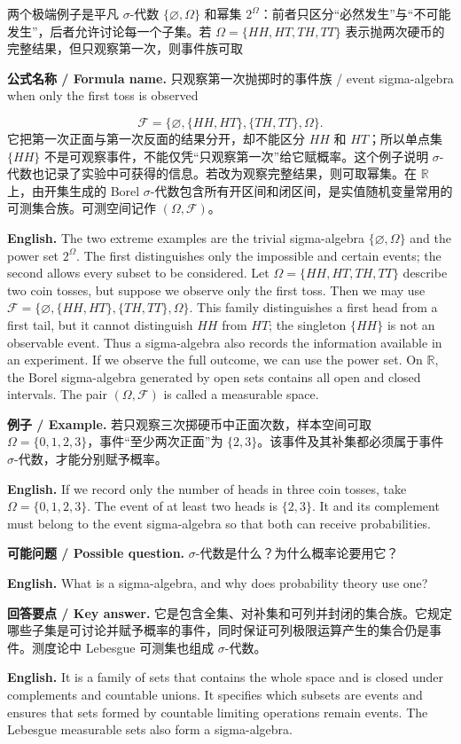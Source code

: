 \documentclass[UTF8,11pt,a4paper]{ctexart}
\newcommand{\EN}[1]{\par\noindent\textbf{English.} #1\par}
\newcommand{\FORMULA}[2]{\par\noindent\textbf{公式名称 / Formula name.} #1 / #2\par}
\newcommand{\EX}[2]{\par\noindent\textbf{例子 / Example.} #1\par\EN{#2}}
\newcommand{\ASK}[4]{\par\noindent\textbf{可能问题 / Possible question.} #1\par\EN{#2}\noindent\textbf{回答要点 / Key answer.} #3\par\EN{#4}\medskip}
\begin{document}
\noindent 两个极端例子是平凡 $\sigma$-代数 $\{\varnothing,\Omega\}$ 和幂集 $2^\Omega$：前者只区分“必然发生”与“不可能发生”，后者允许讨论每一个子集。若 $\Omega=\{HH,HT,TH,TT\}$ 表示抛两次硬币的完整结果，但只观察第一次，则事件族可取
\FORMULA{只观察第一次抛掷时的事件族}{event sigma-algebra when only the first toss is observed}
\[
\mathcal F=\{\varnothing,\{HH,HT\},\{TH,TT\},\Omega\}.
\]
它把第一次正面与第一次反面的结果分开，却不能区分 $HH$ 和 $HT$；所以单点集 $\{HH\}$ 不是可观察事件，不能仅凭“只观察第一次”给它赋概率。这个例子说明 $\sigma$-代数也记录了实验中可获得的信息。若改为观察完整结果，则可取幂集。在 $\mathbb R$ 上，由开集生成的 Borel $\sigma$-代数包含所有开区间和闭区间，是实值随机变量常用的可测集合族。可测空间记作 $(\Omega,\mathcal F)$。
\EN{The two extreme examples are the trivial sigma-algebra $\{\varnothing,\Omega\}$ and the power set $2^\Omega$. The first distinguishes only the impossible and certain events; the second allows every subset to be considered. Let $\Omega=\{HH,HT,TH,TT\}$ describe two coin tosses, but suppose we observe only the first toss. Then we may use $\mathcal F=\{\varnothing,\{HH,HT\},\{TH,TT\},\Omega\}$. This family distinguishes a first head from a first tail, but it cannot distinguish $HH$ from $HT$; the singleton $\{HH\}$ is not an observable event. Thus a sigma-algebra also records the information available in an experiment. If we observe the full outcome, we can use the power set. On $\mathbb R$, the Borel sigma-algebra generated by open sets contains all open and closed intervals. The pair $(\Omega,\mathcal F)$ is called a measurable space.}

\EX{若只观察三次掷硬币中正面次数，样本空间可取 $\Omega=\{0,1,2,3\}$，事件“至少两次正面”为 $\{2,3\}$。该事件及其补集都必须属于事件 $\sigma$-代数，才能分别赋予概率。}{If we record only the number of heads in three coin tosses, take $\Omega=\{0,1,2,3\}$. The event of at least two heads is $\{2,3\}$. It and its complement must belong to the event sigma-algebra so that both can receive probabilities.}

\ASK{$\sigma$-代数是什么？为什么概率论要用它？}{What is a sigma-algebra, and why does probability theory use one?}{它是包含全集、对补集和可列并封闭的集合族。它规定哪些子集是可讨论并赋予概率的事件，同时保证可列极限运算产生的集合仍是事件。测度论中 Lebesgue 可测集也组成 $\sigma$-代数。}{It is a family of sets that contains the whole space and is closed under complements and countable unions. It specifies which subsets are events and ensures that sets formed by countable limiting operations remain events. The Lebesgue measurable sets also form a sigma-algebra.}
\end{document}
